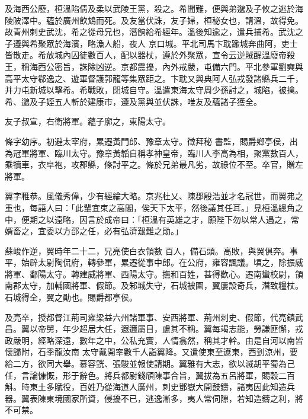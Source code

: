 \begin{pinyinscope}
 及海西公廢，桓溫陷倩及柔以武陵王黨，殺之。希聞難，便與弟邈及子攸之逃於海陵陂澤中。蘊於廣州飲鴆而死。及友當伏誅，友子婦，桓秘女也，請溫，故得免。故青州刺史武沈，希之從母兄也，潛餉給希經年。溫後知逾之，遣兵捕希。武沈之子遵與希聚眾於海濱，略漁人船，夜人
 京口城。平北司馬卞耽踰城奔曲阿，吏士皆散走。希放城內囚徒數百人，配以器杖，遵於外聚眾，宣令云逆賊醒溫廢帝殺王，稱海西公密旨，誅除凶逆。京都震擾，內外戒嚴，屯備六門。平北參軍劉奭與高平太守郗逸之、遊軍督護郭龍等集眾距之。卞耽又與典阿人弘戎發諸縣兵二千，并力屯新城以擊希。希戰敗，閉城自守。溫遣東海太守周少孫討之，城陷，被擒。希、邈及子姪五人斬於建康市，遵及黨與並伏誅，唯友及蘊諸子獲全。



 友子叔宣，右衛將軍。蘊子廓之，東陽太守。



 條字幼序。初避太宰府，累遷黃門郎、豫章太守。徵拜秘
 書監，賜爵鄉亭侯，出為冠軍將軍、臨川太守。豫章黃韜自稱孝神皇帝，臨川人李高為相，聚黨數百人，乘犢車，衣皁袍，攻郡縣，條討平之。條於兄弟最凡劣，故祿位不至。卒官，贈左將軍。



 翼字稚恭。風儀秀偉，少有經綸大略。京兆杜乂、陳郡殷浩並才名冠世，而翼弗之重也，每語人曰：「此輩宜束之高閣，俟天下太平，然後議其任耳。」見桓溫總角之中，便期之以遠略，因言於成帝曰：「桓溫有英雄之才，願陛下勿以常人遇之，常婿畜之，宜委以方邵之任，必有弘濟艱難之勛。」



 蘇峻作逆，翼時年二十二，兄亮使白衣領數
 百人，備石頭。高敗，與翼俱奔。事平，始辟太尉陶侃府，轉參軍，累遷從事中郎。在公府，雍容諷議。頃之，除振威將軍、鄱陽太守。轉建威將軍、西陽太守。撫和百姓，甚得歡心。遷南蠻校尉，領南郡太守，加輔國將軍、假節。及邾城失守，石城被圍，翼屢設奇兵，潛致糧杖。石城得全，翼之勛也。賜爵都亭侯。



 及亮卒，授都督江荊司雍梁益六州諸軍事、安西將軍、荊州刺史、假節，代亮鎮武昌。翼以帝舅，年少超居大任，遐邇屬目，慮其不稱。翼每竭志能，勞謙匪懈，戎政嚴明，經略深遠，數年之中，公私充實，人情翕然，稱其才幹。由是自河以南皆懷歸附，石季龍汝南
 太守戴開率數千人詣翼降。又遣使東至遼東，西到涼州，要給二方，欲同大舉。慕容皝、張駿並報使請期。翼雅有大志，欲以滅胡平蜀為己任，言論慷慨，形于辭色。將兵都尉錢頎陳事合旨，翼拔為五呂將軍，賜穀二百斛。時東土多賦役，百姓乃從海道人廣州，刺史鄧嶽大開鼓鑄，諸夷因此知造兵器。翼表陳東境國家所資，侵擾不已，逃逸漸多，夷人常伺隙，若知造鑄之利，將不可禁。




\end{pinyinscope}
